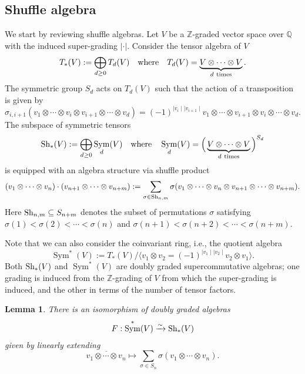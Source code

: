 \documentclass[10pt]{amsart}
\newcommand{\BZ}{\mathbb{Z}}
\newcommand{\BQ}{\mathbb{Q}}
\newcommand{\+}{{}^+}
\newcommand{\Sh}{\textnormal{Sh}}
\DeclareMathOperator{\Sym}{Sym}
\newtheorem {lemma}[theorem]{Lemma}
\theoremstyle{definition}
\theoremstyle {definition}
\theoremstyle {definition}
\begin{document}
\subsection{Shuffle algebra} 

We start by reviewing shuffle algebras. Let $V$ be a $\BZ$-graded vector space over $\BQ$ with the induced super-grading $|\cdot|$. Consider the tensor algebra of $V$
$$T_*(V):=\bigoplus_{d\geq 0}T_d(V)\quad\textnormal{where}\quad T_d(V)=\underbrace{V \otimes \cdots \otimes V}_{d \ \mathrm{times}}. 
$$
The symmetric group $S_d$ acts on $T_d(V)$ such that the action of a transposition is given by 
$$\sigma_{i,i+1}(v_{1} \otimes \cdots \otimes v_{i} \otimes v_{i+1} \otimes \cdots \otimes v_{d}) = (-1)^{\mid v_i \mid \mid v_{i+1} \mid}v_{1} \otimes \cdots \otimes v_{i+1} \otimes v_{i} \otimes \cdots \otimes v_{d}.$$
The subspace of symmetric tensors 
$$\Sh_*(V):=\bigoplus_{d\geq 0} \Sym_d(V)\quad\textnormal{where}\quad\Sym_d(V)=\Big(\underbrace{V \otimes \cdots \otimes V}_{d \ \mathrm{times}}\Big)^{S_d}
$$
is equipped with an algebra structure via shuffle product
\begin{align} \label{def:Shufflealgebrausualstructure}
(v_1 \otimes \cdots \otimes v_n) \cdot (v_{n+1} \otimes \cdots\otimes v_{n+m}) := \sum_{\sigma \in \Sh_{n,m}} \sigma(v_1 \otimes \cdots \otimes v_n \otimes v_{n+1} \otimes \cdots\otimes v_{n+m}). \end{align}
Here $\Sh_{n,m}\subseteq S_{n+m}$ denotes the subset of permutations $\sigma$ satisfying $\sigma(1)<\sigma(2)<\cdots<\sigma(n)$ and $\sigma(n+1)<\sigma(n+2)<\cdots<\sigma(n+m)$. 

Note that we can also consider the coinvariant ring, i.e., the quotient algebra 
\[ \Sym^*(V) := T_*(V)/\langle v_{1} \otimes v_{2} = (-1)^{\mid v_1 \mid \mid v_2 \mid} v_{2} \otimes v_{1} \rangle. \]
Both $\Sh_*(V)$ and $\Sym^{*}(V)$ are doubly graded supercommutative algebras; one grading is induced from the $\BZ$-grading of $V$ from which the super-grading is induced, and the other in terms of the number of tensor factors. 



\begin{lemma}\label{lem: isomorphismofshufflealgebraandcoalgebra}
There is an isomorphism of doubly graded algebras 
\begin{align}  F: \Sym^*(V)\xrightarrow{\sim} \Sh_*(V) \end{align} given by linearly extending
\[ \overline{v_{1} \otimes \cdots \otimes v_n} \mapsto  \sum_{\sigma \in S_n} \sigma(v_1 \otimes \cdots \otimes v_n). \]
\end{lemma} 
\end{document}
